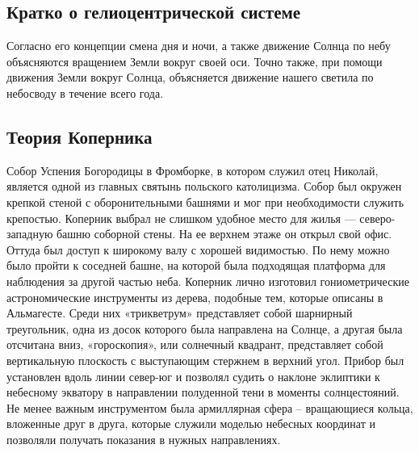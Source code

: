 \documentclass[
]{article}
\begin{document}
\hypertarget{ux43aux440ux430ux442ux43aux43e-ux43e-ux433ux435ux43bux438ux43eux446ux435ux43dux442ux440ux438ux447ux435ux441ux43aux43eux439-ux441ux438ux441ux442ux435ux43cux435}{%
\subsection{Кратко о гелиоцентрической
системе}\label{ux43aux440ux430ux442ux43aux43e-ux43e-ux433ux435ux43bux438ux43eux446ux435ux43dux442ux440ux438ux447ux435ux441ux43aux43eux439-ux441ux438ux441ux442ux435ux43cux435}}

Согласно его концепции смена дня и ночи, а также движение Солнца по небу
объясняются вращением Земли вокруг своей оси. Точно также, при помощи
движения Земли вокруг Солнца, объясняется движение нашего светила по
небосводу в течение всего года.

\hypertarget{ux442ux435ux43eux440ux438ux44f-ux43aux43eux43fux435ux440ux43dux438ux43aux430}{%
\subsection{Теория
Коперника}\label{ux442ux435ux43eux440ux438ux44f-ux43aux43eux43fux435ux440ux43dux438ux43aux430}}

Собор Успения Богородицы в Фромборке, в котором служил отец Николай,
является одной из главных святынь польского католицизма. Собор был
окружен крепкой стеной с оборонительными башнями и мог при необходимости
служить крепостью. Коперник выбрал не слишком удобное место для жилья
--- северо-западную башню соборной стены. На ее верхнем этаже он открыл
свой офис. Оттуда был доступ к широкому валу с хорошей видимостью. По
нему можно было пройти к соседней башне, на которой была подходящая
платформа для наблюдения за другой частью неба. Коперник лично изготовил
гониометрические астрономические инструменты из дерева, подобные тем,
которые описаны в Альмагесте. Среди них «трикветрум» представляет собой
шарнирный треугольник, одна из досок которого была направлена
\hspace{0pt}\hspace{0pt}на Солнце, а другая была отсчитана вниз,
«гороскопия», или солнечный квадрант, представляет собой вертикальную
плоскость с выступающим стержнем в верхний угол. Прибор был установлен
вдоль линии север-юг и позволял судить о наклоне эклиптики к небесному
экватору в направлении полуденной тени в моменты солнцестояний. Не менее
важным инструментом была армиллярная сфера -- вращающиеся кольца,
вложенные друг в друга, которые служили моделью небесных координат и
позволяли получать показания в нужных направлениях.
\end{document}
